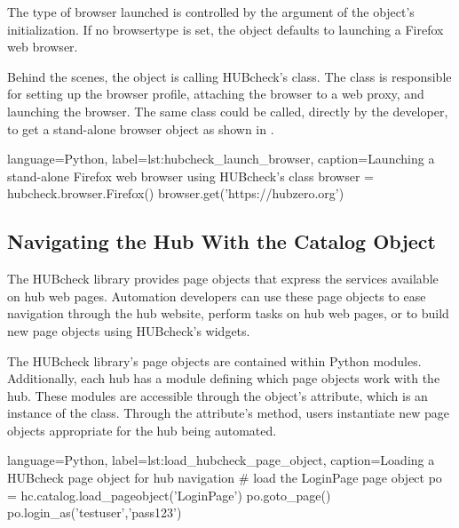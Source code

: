 The type of browser launched is controlled by the 
argument of the  object's initialization. If no browsertype
is set, the object defaults to launching a Firefox web browser.

Behind the scenes, the  object is calling HUBcheck's
 class. The  class is responsible for setting
up the browser profile, attaching the browser to a web proxy, and launching the
browser. The same class could be called, directly by the developer, to get a
stand-alone browser object as shown in .

\begin{xcode}{%
  language=Python,%
  label=lst:hubcheck_launch_browser,%
  caption={Launching a stand-alone Firefox web browser using HUBcheck's  class}%
}
browser = hubcheck.browser.Firefox()
browser.get('https://hubzero.org')
\end{xcode}

\subsection{Navigating the Hub With the Catalog Object}
\label{ssec:hubcheck_web_modules_navigation}

The HUBcheck library provides page objects that express the services available
on hub web pages. Automation developers can use these page objects to ease
navigation through the hub website, perform tasks on hub web pages, or to build
new page objects using HUBcheck's widgets.

The HUBcheck library's page objects are contained within Python modules.
Additionally, each hub has a module defining which page objects work with the
hub.  These modules are accessible through the  object's
 attribute, which is an instance of the
 class.  Through the  attribute's
 method, users instantiate new page objects
appropriate for the hub being automated.

\begin{xcode}{%
  language=Python,%
  label=lst:load_hubcheck_page_object,%
  caption={Loading a HUBcheck page object for hub navigation}%
}
# load the LoginPage page object
po = hc.catalog.load_pageobject('LoginPage')
po.goto_page()
po.login_as('testuser','pass123')
\end{xcode}

